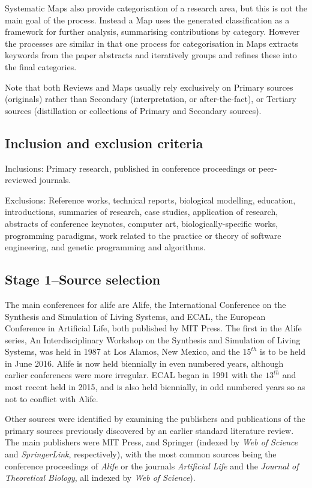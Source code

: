 Systematic Maps also provide categorisation of a research area, but this is not the main goal of the process. Instead a Map uses the generated classification as a framework for further analysis, summarising contributions by category. However the processes are similar in that one process for categorisation in Maps \parencite{Petersen:2008fk} extracts keywords from the paper abstracts and iteratively groups and refines these into the final categories.

Note that both Reviews and Maps usually rely exclusively on Primary sources (originals) rather than Secondary (interpretation, or after-the-fact), or Tertiary sources (distillation or collections of Primary and Secondary sources).

\subsection{Inclusion and exclusion criteria}
Inclusions: Primary research, published in conference proceedings or peer-reviewed journals.

Exclusions: Reference works, technical reports, biological modelling, education, introductions, summaries of research, case studies, application of research, abstracts of conference keynotes, computer art, biologically-specific works, programming paradigms, work related to the practice or theory of software engineering, and genetic programming and algorithms.

\subsection{Stage 1--Source selection}
The main conferences for \gls{alife} are Alife, the International Conference on the Synthesis and Simulation of Living Systems, and ECAL, the European Conference in Artificial Life, both published by MIT Press. The first in the Alife series, An Interdisciplinary Workshop on the Synthesis and Simulation of Living Systems, was held in 1987 at Los Alamos, New Mexico, and the $15^{th}$ is to be held in June 2016. Alife is now held biennially in even numbered years, although earlier conferences were more irregular. ECAL began  in 1991 with the $13^{th}$ and most recent held in 2015, and is also held biennially, in odd numbered years so as not to conflict with Alife.

Other sources were identified by examining the publishers and publications of the primary sources previously discovered by an earlier standard literature review. The main publishers were MIT Press, and Springer (indexed by \emph{Web of Science} and \emph{SpringerLink}, respectively), with the most common sources being the conference proceedings of \emph{Alife} or the journals \emph{Artificial Life} and the \emph{Journal of Theoretical Biology}, all indexed by \emph{Web of Science}).

